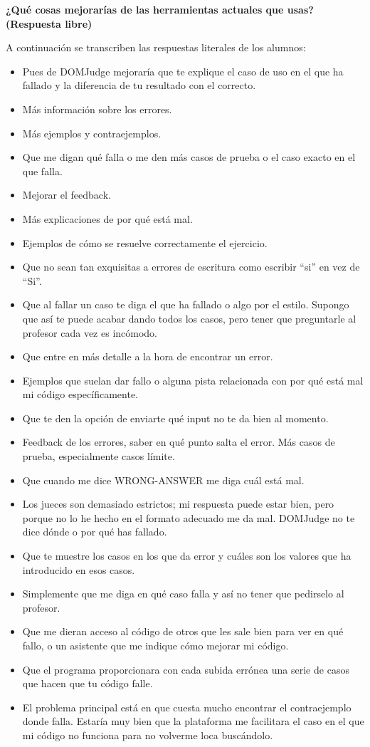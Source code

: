 \textbf{¿Qué cosas mejorarías de las herramientas actuales que usas? (Respuesta libre)}

A continuación se transcriben las respuestas literales de los alumnos:
\begin{itemize}
    \item Pues de DOMJudge mejoraría que te explique el caso de uso en el que ha fallado y la diferencia de tu resultado con el correcto.
    \item Más información sobre los errores.
    \item Más ejemplos y contraejemplos.
    \item Que me digan qué falla o me den más casos de prueba o el caso exacto en el que falla.
    \item Mejorar el feedback.
    \item Más explicaciones de por qué está mal.
    \item Ejemplos de cómo se resuelve correctamente el ejercicio.
    \item Que no sean tan exquisitas a errores de escritura como escribir “si” en vez de “Si”.
    \item Que al fallar un caso te diga el que ha fallado o algo por el estilo. Supongo que así te puede acabar dando todos los casos, pero tener que preguntarle al profesor cada vez es incómodo.
    \item Que entre en más detalle a la hora de encontrar un error.
    \item Ejemplos que suelan dar fallo o alguna pista relacionada con por qué está mal mi código específicamente.
    \item Que te den la opción de enviarte qué input no te da bien al momento.
    \item Feedback de los errores, saber en qué punto salta el error. Más casos de prueba, especialmente casos límite.
    \item Que cuando me dice WRONG-ANSWER me diga cuál está mal.
    \item Los jueces son demasiado estrictos; mi respuesta puede estar bien, pero porque no lo he hecho en el formato adecuado me da mal. DOMJudge no te dice dónde o por qué has fallado.
    \item Que te muestre los casos en los que da error y cuáles son los valores que ha introducido en esos casos.
    \item Simplemente que me diga en qué caso falla y así no tener que pedirselo al profesor.
    \item Que me dieran acceso al código de otros que les sale bien para ver en qué fallo, o un asistente que me indique cómo mejorar mi código.
    \item Que el programa proporcionara con cada subida errónea una serie de casos que hacen que tu código falle.
    \item El problema principal está en que cuesta mucho encontrar el contraejemplo donde falla. Estaría muy bien que la plataforma me facilitara el caso en el que mi código no funciona para no volverme loca buscándolo.
\end{itemize}

